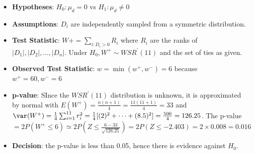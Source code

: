 \documentclass[a4paper]{article}
\begin{document}
	\begin{itemize}
		\item \textbf{Hypotheses}: \( H_0: \mu_d = 0 \) vs \( H_1: \mu_d \neq 0 \)
		\item \textbf{Assumptions}: \( D_i \) are independently sampled from a symmetric distribution.
		\item \textbf{Test Statistic}: \( W+ = \sum_{i:D_i > 0} R_i \) where \( R_i \) are the ranks of \( \lvert D_1 \rvert, \lvert D_2 \rvert, \dotsc, \lvert D_n \rvert \). Under \( H_0, W^+ \sim WSR^\prime(11) \) and the set of ties as given.
		\item \textbf{Observed Test Statistic}: \( w = \min(w^+,w^-) = 6 \) because \( w^+ = 60, w^- = 6 \) 
		\item \textbf{p-value}: SInce the \( WSR^\prime(11) \) distribution is unknown, it is approximated by normal with \( E(W^+) = \frac{n(n+1)}{4} = \frac{11(11+1)}{4} = 33 \) and \( \var(W^+) = \frac{1}{4} \sum_{i=1}^{11} r^{2}_{i} = \frac{1}{4} [(2)^{2}+\dotsb+(8.5)^{2}] = \frac{506}{4} = 126.25 \). The p-value \( = 2P(W^+ \leq 6) \simeq 2P (Z \leq \frac{6-33}{\sqrt{126.25}}) = 2P(Z \leq -2.403) = 2 \times 0.008 = 0.016 \)  
		\item \textbf{Decision}: the p-value is less than 0.05, hence there is evidence against \( H_0 \).
	\end{itemize}
\end{document}
